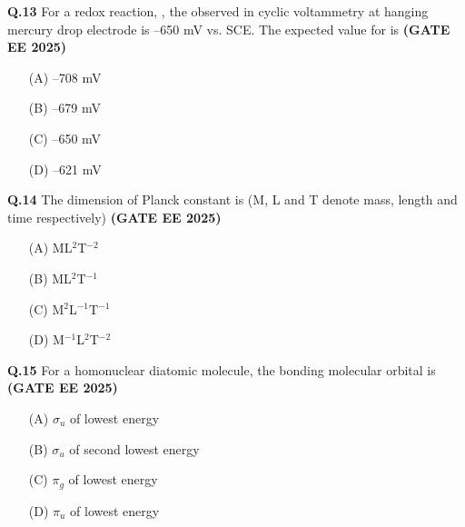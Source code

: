 \documentclass[journal,12pt,onecolumn]{exam}
\theoremstyle{remark}
\begin{document}
\noindent \textbf{Q.13} For a redox reaction, , the  observed in cyclic voltammetry at hanging mercury drop electrode is --650 mV vs. SCE. The expected value for  is \hfill{\textbf{(GATE EE 2025)}}
\begin{multicols}{2}
\begin{itemize}[leftmargin=*,labelsep=1em]
    \item[(A)] --708 mV
    \item[(B)] --679 mV
    \item[(C)] --650 mV
    \item[(D)] --621 mV
\end{itemize}
\end{multicols}
\vspace{0.5cm}

\noindent \textbf{Q.14} The dimension of Planck constant is (M, L and T denote mass, length and time respectively) \hfill{\textbf{(GATE EE 2025)}}
\begin{multicols}{2}
\begin{itemize}[leftmargin=*,labelsep=1em]
    \item[(A)] ML$^2$T$^{-2}$
    \item[(B)] ML$^2$T$^{-1}$
    \item[(C)] M$^2$L$^{-1}$T$^{-1}$
    \item[(D)] M$^{-1}$L$^2$T$^{-2}$
\end{itemize}
\end{multicols}
\vspace{0.5cm}

\noindent \textbf{Q.15} For a homonuclear diatomic molecule, the bonding molecular orbital is \hfill{\textbf{(GATE EE 2025)}}
\begin{multicols}{2}
\begin{itemize}[leftmargin=*,labelsep=1em]
    \item[(A)] $\sigma_u$ of lowest energy
    \item[(B)] $\sigma_u$ of second lowest energy
    \item[(C)] $\pi_g$ of lowest energy
    \item[(D)] $\pi_u$ of lowest energy
\end{itemize}
\end{multicols}
\vspace{0.5cm}
\end{document}
